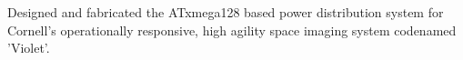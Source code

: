 \documentclass[]{deedy-resume-openfont}
\begin{document}
\begin{minipage}[t]{0.66\textwidth}
                Designed and fabricated the ATxmega128 based power distribution
                system for Cornell’s operationally responsive, high agility
                space imaging system codenamed 'Violet'.
    \sectionsep



\end{minipage}
\end{document}
